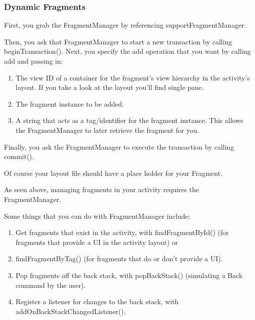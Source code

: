 \subsubsection{Dynamic Fragments}
First, you grab the FragmentManager by referencing supportFragmentManager.

Then, you ask that FragmentManager to start a new transaction by calling beginTransaction(). Next, you specify the add operation that you want by calling add and passing in:

\begin{enumerate}
\item The view ID of a container for the fragment’s view hierarchy in the activity’s layout. If you take a look at the layout you'll find single pane.
\item The fragment instance to be added.
\item A string that acts as a tag/identifier for the fragment instance. This allows the FragmentManager to later retrieve the fragment for you.
\end{enumerate}

Finally, you ask the FragmentManager to execute the transaction by calling commit().



Of course your layout file should have a place holder for your Fragment.



As seen above, managing fragments in your activity requires the FragmentManager. 

Some things that you can do with FragmentManager include:

\begin{enumerate}
	\item Get fragments that exist in the activity, with findFragmentById() (for fragments that provide a UI in the activity layout) or \item findFragmentByTag() (for fragments that do or don't provide a UI).
	\item Pop fragments off the back stack, with popBackStack() (simulating a Back command by the user).
	\item Register a listener for changes to the back stack, with addOnBackStackChangedListener().
\end{enumerate}

